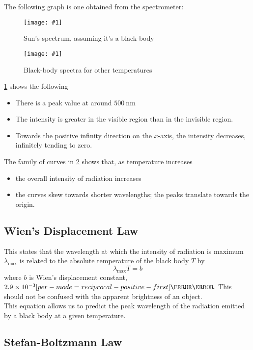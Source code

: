 \documentclass[a4paper,12pt]{article}
\let\oldsi\si
\renewcommand{\si}[1]{\oldsi[per-mode=reciprocal-positive-first]{#1}}
\newcommand{\lb}{\\[8pt]}
\newcommand{\img}[4]{\begin{center}
  \begin{figure}[H]
    \centering
    \texttt{[image: \#1]}
    \caption{#3}
    \label{fig:#4}
  \end{figure}
\end{center}}
\begin{document}
The following graph is one obtained from the spectrometer:

\begin{minipage}{0.45\textwidth}
  \img{spectrumgraph.png}{1}{Sun's spectrum, assuming it's a black-body}{spectrum}
\end{minipage}%
\hspace{0.1\textwidth}
\begin{minipage}{0.5\textwidth}
  \img{spectragraphs.png}{1}{Black-body spectra for
    other temperatures}{spectra}
\end{minipage}

\cref{fig:spectrum} shows the following
\begin{itemize}
  \item There is a peak value at around $\SI{500}{\nano\m}$
  \item The intensity is greater in the visible region than in the invisible region.
  \item Towards the positive infinity direction on the $x$-axis, the intensity decreases, infinitely tending to zero.
\end{itemize}

The family of curves in \cref{fig:spectra} shows that, as temperature increases
\begin{itemize}
  \item the overall intensity of radiation increases
  \item the curves skew towards shorter wavelengths; the peaks translate towards the origin.
\end{itemize}

\pagebreak

\subsection{Wien's Displacement Law}

This states that the wavelength at which the intensity of radiation is maximum $\lambda_{\max}$ is related to the absolute temperature of the black body $T$ by
$$\lambda_{\max}T = b$$
where $b$ is Wien's displacement constant, $2.9 \times 10^{-3} \si{\m\kelvin}$. This should not be confused with the apparent brightness of an object.\lb
This equation allows us to predict the peak wavelength of the radiation emitted by a black body at a given temperature.

\subsection{Stefan-Boltzmann Law}
\end{document}
